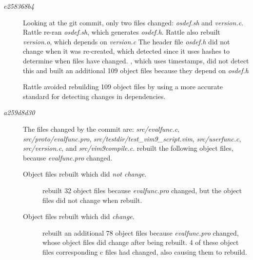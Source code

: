\begin{description}
\item[\emph{e258368b4}]
  Looking at the git commit, only two files changed: \emph{osdef.sh} and \emph{version.c}.  Rattle re-ran \emph{osdef.sh}, which generates \emph{osdef.h}.  Rattle also rebuilt \emph{version.o}, which depends on \emph{version.c}
  The header file \emph{osdef.h} did not change when it was re-created, which \Rattle detected since it uses hashes to determine when files have changed.  \Make, which uses timestamps, did not detect this and built an additional 109 object files because they depend on \emph{osdef.h}

  Rattle avoided rebuilding 109 object files by using a more accurate standard for detecting changes in dependencies.

\item[\emph{a259d8d30}]
  The files changed by the commit are: \emph{src/evalfunc.c}, \emph{src/proto/evalfunc.pro},
  \emph{src/testdir/test\_vim9\_script.vim}, \emph{src/userfunc.c}, \emph{src/version.c}, and
  \emph{src/vim9compile.c}.
  \Rattle rebuilt the following object files, because \emph{evalfunc.pro} changed.
  \begin{description}
  \item[Object files rebuilt which did \emph{not change}.] \Rattle rebuilt 32 object files because \emph{evalfunc.pro} changed, but the object files did not change when rebuilt.
  \item[Object files rebuilt which did \emph{change}.] \Rattle rebuilt an additional 78 object files because \emph{evalfunc.pro} changed, whose object files did change after being rebuilt.
    4 of these object files corresponding c files had changed, also causing them to rebuild.

  \end{description}
\end{description}

